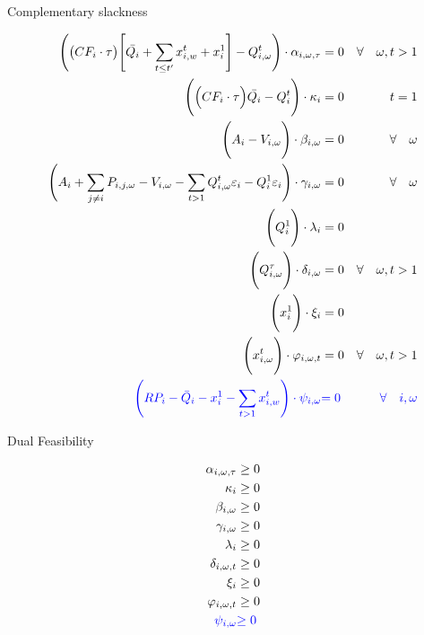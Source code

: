 \documentclass[11pt, letterpaper]{article}
\begin{document}
\smallskip

\begin{flushleft}
Complementary slackness
\end{flushleft}

\begin{align}
    \Bigg( \big(CF_i \cdot \tau \big) \Bigg[\bar{Q_i} + \sum_{t\leq t^{\prime}} x^{t}_{i,w} + x_i^{1} \Bigg] - Q_{i,\omega}^{t} \Bigg) \cdot \alpha_{i,\omega,\tau} & = 0 & \forall  \quad \omega, t  > 1\\
    \Bigg( \Big(CF_i\cdot\tau \Big)\bar{Q_i}-Q_{i}^{t} \Bigg)\cdot \kappa_i & = 0  & \quad t  =1 \\
    \Bigg(  A_{i} -V_{i,\omega} \Bigg) \cdot \beta_{i,\omega} & = 0 & \forall  \quad \omega\\
    \Bigg( A_{i} + \sum_{j \neq i}P_{i,j,\omega} - V_{i,\omega}-\sum_{t>1}Q_{i,\omega}^{t}\varepsilon_{i}-Q_i^{1}\varepsilon_{i}\Bigg)\cdot \gamma_{i,\omega} & = 0 & \forall \quad \omega \\
    \Bigg( Q_i^{1} \Bigg) \cdot \lambda_i & = 0 & \\
    \Bigg(Q_{i,\omega}^{\tau}\Bigg ) \cdot \delta_{i,\omega} & = 0 & \forall  \quad \omega, t >1\\
    \Bigg( x_i^{1} \Bigg) \cdot \xi_i & = 0 & \\
    \Bigg( x_{i, \omega}^{t} \Bigg) \cdot \varphi_{i,\omega,t} & = 0 & \forall  \quad \omega, t >1 \\
    {\color{blue} \Bigg(RP_i - \bar{Q}_i - x^{1}_i - \sum_{t>1} x^{t}_{i,w}  \Bigg) \cdot \psi_{i,\omega}}&  {\color{blue} = 0 }&  {\color{blue} \forall \quad i,\omega }
\end{align}

\smallskip

\begin{flushleft}
Dual Feasibility
\end{flushleft}

\begin{align}
    \alpha_{i,\omega,\tau} & \geq 0 \\
    \kappa_i & \geq 0 \\
    \beta_{i,\omega} & \geq 0 \\
    \gamma_{i,\omega} & \geq 0 \\
    \lambda_i & \geq 0 \\
    \delta_{i,\omega,t} & \geq 0 \\
    \xi_i & \geq 0 \\
    \varphi_{i,\omega,t} & \geq 0 \\
    {\color{blue}\psi_{i,\omega}} & {\color{blue} \geq 0}
\end{align}
\end{document}
